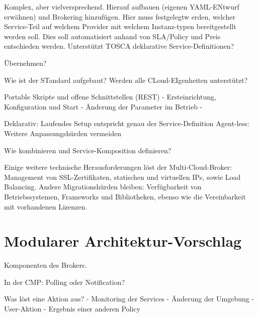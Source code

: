 Komplex, aber vielversprechend. Hierauf aufbauen (eigenen YAML-ENtwurf erwähnen) und Brokering hinzufügen. Hier muss festgelegtw erden, welcher Service-Teil auf welchem Provider mit welchem Instanz-typen bereitgestellt werden soll. Dies soll automatisiert anhand von SLA/Policy und Preis entschieden werden. Unterstützt TOSCA deklarative Service-Definitionen?

Übernehmen?

Wie ist der STandard aufgebaut? Werden alle CLoud-EIgenheiten unterstützt?


Portable Skripte und offene Schnittstellen (REST)
- Ersteinrichtung, Konfiguration und Start
- Änderung der Parameter im Betrieb
- 

Deklarativ: Laufendes Setup entspricht genau der Service-Definition
Agent-less: Weitere Anpassungshürden vermeiden

Wie kombinieren und Service-Komposition definieren?

Einige weitere technische Herausforderungen löst der Multi-Cloud-Broker: Management von SSL-Zertifikaten, statischen und virtuellen IPs, sowie Load Balancing. Andere Migrationshürden bleiben: Verfügbarkeit von Betriebssystemen, Frameworks und Bibliotheken, ebenso wie die Vereinbarkeit mit vorhandenen Lizenzen.



\section{Modularer Architektur-Vorschlag}

Komponenten des Brokers.


In der CMP: Polling oder Notification?

Was löst eine Aktion aus?
- Monitoring der Services
- Änderung der Umgebung
- User-Aktion
- Ergebnis einer anderen Policy


